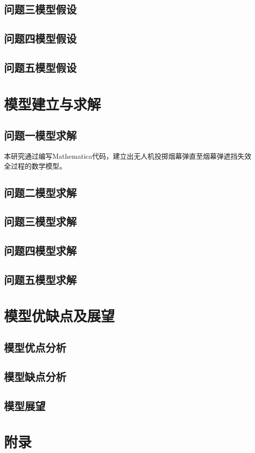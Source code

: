 \documentclass{article}
\begin{document}
\subsection{问题三模型假设}

\subsection{问题四模型假设}

\subsection{问题五模型假设}

\section{模型建立与求解}

\subsection{问题一模型求解}

本研究通过编写Mathematica代码，建立出无人机投掷烟幕弹直至烟幕弹遮挡失效全过程的数学模型。
\subsection{问题二模型求解}

\subsection{问题三模型求解}

\subsection{问题四模型求解}

\subsection{问题五模型求解}

\section{模型优缺点及展望}

\subsection{模型优点分析}

\subsection{模型缺点分析}

\subsection{模型展望}




\section*{附录}
\vspace{-1em}


\noindent
\end{document}
